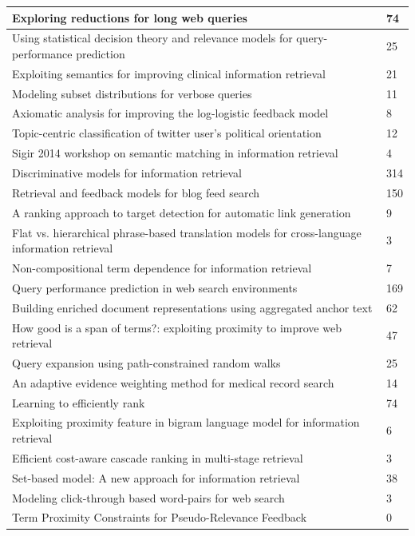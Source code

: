 \documentclass[letterpaper,11pt]{article}
\begin{document}
\begin{center}
\begin{longtable}{|*2{p{3.5cm}| }}
Exploring reductions for long web queries & 74 \\ \hline
Using statistical decision theory and relevance models for query-performance prediction & 25 \\ \hline
Exploiting semantics for improving clinical information retrieval & 21 \\ \hline
Modeling subset distributions for verbose queries & 11 \\ \hline
Axiomatic analysis for improving the log-logistic feedback model & 8 \\ \hline
Topic-centric classification of twitter user's political orientation & 12 \\ \hline
Sigir 2014 workshop on semantic matching in information retrieval & 4 \\ \hline
Discriminative models for information retrieval & 314 \\ \hline
Retrieval and feedback models for blog feed search & 150 \\ \hline
A ranking approach to target detection for automatic link generation & 9 \\ \hline
Flat vs. hierarchical phrase-based translation models for cross-language information retrieval & 3 \\ \hline
Non-compositional term dependence for information retrieval & 7 \\ \hline
Query performance prediction in web search environments & 169 \\ \hline
Building enriched document representations using aggregated anchor text & 62 \\ \hline
How good is a span of terms?: exploiting proximity to improve web retrieval & 47 \\ \hline
Query expansion using path-constrained random walks & 25 \\ \hline
An adaptive evidence weighting method for medical record search & 14 \\ \hline
Learning to efficiently rank & 74 \\ \hline
Exploiting proximity feature in bigram language model for information retrieval & 6 \\ \hline
Efficient cost-aware cascade ranking in multi-stage retrieval & 3 \\ \hline
Set-based model: A new approach for information retrieval & 38 \\ \hline
Modeling click-through based word-pairs for web search & 3 \\ \hline
Term Proximity Constraints for Pseudo-Relevance Feedback & 0 \\ \hline

\end{longtable}
\end{center}
\end{document}
